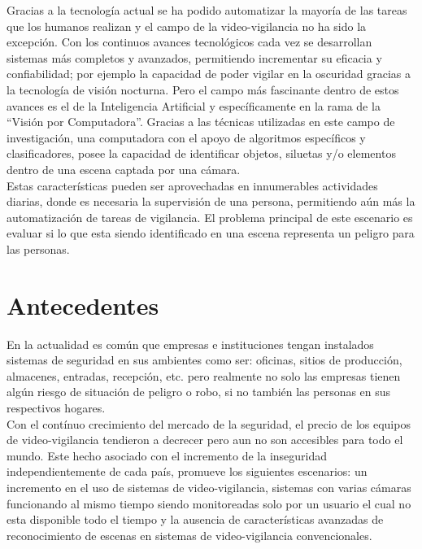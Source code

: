 Gracias a la tecnología actual se ha podido automatizar la mayoría de las tareas que los humanos realizan y el campo de la video-vigilancia no ha sido la excepción. Con los continuos avances tecnológicos cada vez se desarrollan sistemas más completos y avanzados, permitiendo incrementar su eficacia y confiabilidad; por ejemplo la capacidad de poder vigilar en la oscuridad gracias a la tecnología de visión nocturna. Pero el campo más fascinante dentro de estos avances es el de la Inteligencia Artificial y específicamente en la rama de la ``Visión por Computadora''. Gracias a las técnicas utilizadas en este campo de investigación, una computadora con el apoyo de algoritmos específicos y clasificadores, posee la capacidad de identificar objetos, siluetas y/o elementos dentro de una escena captada por una cámara.\\

Estas características pueden ser aprovechadas en innumerables actividades diarias, donde es necesaria la supervisión de una persona, permitiendo aún más la automatización de tareas de vigilancia. El problema principal de este escenario es evaluar si lo que esta siendo identificado en una escena representa un peligro para las personas.\\

\section{Antecedentes}
En la actualidad es común que empresas e instituciones tengan instalados sistemas de seguridad en sus ambientes como ser: oficinas, sitios de producción, almacenes, entradas, recepción, etc. pero realmente no solo las empresas tienen algún riesgo de situación de peligro o robo, si no también las personas en sus respectivos hogares.\\

Con el contínuo crecimiento del mercado de la seguridad, el precio de los equipos de video-vigilancia tendieron a decrecer pero aun no son accesibles para todo el mundo. Este hecho asociado con el incremento de la inseguridad independientemente de cada país, promueve los siguientes escenarios: un incremento en el uso de sistemas de video-vigilancia, sistemas con varias cámaras funcionando al mismo tiempo siendo monitoreadas solo por un usuario el cual no esta disponible todo el tiempo y la ausencia de características avanzadas de reconocimiento de escenas en sistemas de video-vigilancia convencionales.\

